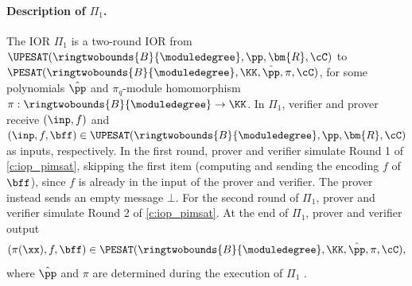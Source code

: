 



\paragraph{Description of $\Pi_1$.} The IOR $\Pi_1$ is a two-round IOR from $\UPESAT(\ringtwobounds{B}{\moduledegree}, \pp,\bm{R}, \cC)$ to $\PESAT(\ringtwobounds{B}{\moduledegree},\KK, \hat{\pp},\pi,\cC)$, for some polynomials $\hat{\pp}$ and $\pi_q$-module homomorphism $\pi:\ringtwobounds{B}{\moduledegree} \to \KK$. In $\Pi_1$, verifier and prover receive $(\inp, f)$ and $(\inp, f,\bff)\in \UPESAT(\ringtwobounds{B}{\moduledegree}, \pp,\bm{R}, \cC)$ as inputs, respectively. In the first round, prover and verifier simulate Round 1 of \cref{c:iop_pimsat}, skipping the first item (computing and sending the encoding $f$ of $\bff$), since $f$ is already in the input of the prover and verifier. The prover instead  sends an empty message $\bot$. For the second round of $\Pi_1$, prover and verifier simulate Round 2 of \cref{c:iop_pimsat}. At the end of $\Pi_1$, prover and verifier output $$(\pi(\xx),f,\bff)\in \PESAT(\ringtwobounds{B}{\moduledegree},\KK, \hat{\pp},\pi,\cC),$$
where $\hat{\pp}$ and $\pi$ are determined during the execution of $\Pi_1$ .
%

